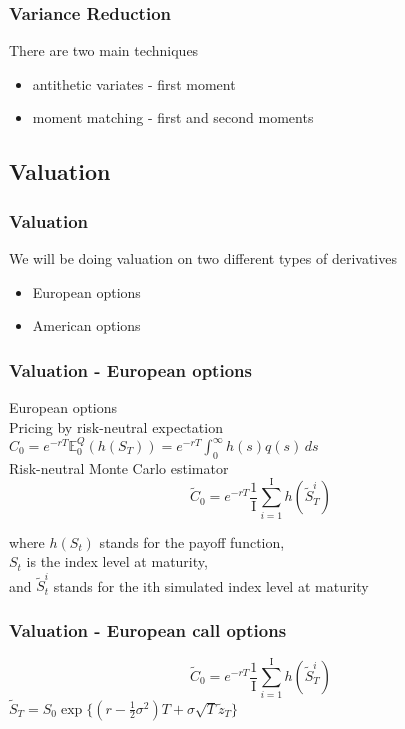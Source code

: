 \documentclass{beamer}
\begin{document}
\begin{frame}
\frametitle{Variance Reduction}
There are two main techniques
\begin{itemize}
	\item antithetic variates - first moment
	\item moment matching - first and second moments
\end{itemize}
\end{frame}

\subsection{Valuation}
\begin{frame}
\frametitle{Valuation}
We will be doing valuation on two different types of derivatives\\ [4mm]
\begin{itemize}
	\item European options\\[9mm]
	\item American options
\end{itemize}
\end{frame}

\begin{frame}
\frametitle{Valuation - European options}
\begin{center}
European options\\ [8mm]
Pricing by risk-neutral expectation\\ [3mm]
$C_{0} = e^{-rT} \mathbb{E}_{0}^{Q}(h(S_{T})) = e^{-rT} \int_{0}^{\infty} h(s)q(s) \,ds $\\ [6mm]
Risk-neutral Monte Carlo estimator
$$\tilde{C}_{0} = e^{-rT} \frac{1}{\mathrm{I}} \sum_{i=1}^{\mathrm{I}} h({\tilde{S}}_{T}^{i}) $$
\end{center}
\begin{flushright}
where $h(S_{t})$ stands for the payoff function, \\
$S_{t}$ is the index level at maturity, \\
and $\tilde{S}_{t}^{i} $ stands for the ith simulated index level at maturity
\end{flushright}
\end{frame}

\begin{frame}
\frametitle{Valuation - European call options}
\begin{center}
$$\tilde{C}_{0} = e^{-rT} \frac{1}{\mathrm{I}} \sum_{i=1}^{\mathrm{I}} h({\tilde{S}}_{T}^{i}) $$
$\tilde{S}_{T} = S_{0}\exp\{(r-\frac{1}{2}\sigma^{2})T + \sigma\sqrt{T}\tilde{z}_{T}\}$\\[5mm]
\end{center}
\end{frame}
\end{document}
